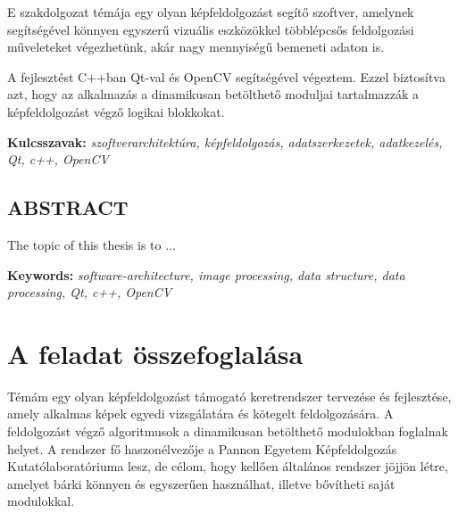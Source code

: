 \documentclass[a4paper,12pt,oneside]{report}
\begin{document}
E szakdolgozat témája egy olyan képfeldolgozást segítő szoftver, amelynek segítségével könnyen egyszerű vizuális eszközökkel többlépcsős feldolgozási műveleteket végezhetünk, akár nagy mennyiségű bemeneti adaton is.

A fejlesztést C++ban Qt-val és OpenCV segítségével végeztem. Ezzel biztosítva azt, hogy az alkalmazás a dinamikusan betölthető moduljai tartalmazzák a képfeldolgozást végző logikai blokkokat.



\vspace{2cm}

{\bf Kulcsszavak:} {\it szoftverarchitektúra, képfeldolgozás, adatszerkezetek, adatkezelés, Qt, c++, OpenCV}
\newpage

\newpage

\begin{center}
\section*{\textbf{\Large \MakeUppercase{Abstract}}}
\end{center}

The topic of this thesis is to ...

\vspace{2cm}

{\bf Keywords:} {\it software-architecture, image processing, data structure, data processing, Qt, c++, OpenCV}
\newpage

\renewcommand{\thefigure}{\arabic{figure}}


\setcounter{tocdepth}{3} %
\thispagestyle{empty}
\tableofcontents
\pagebreak

\setcounter{page}{1} %
\pagestyle{plain}
\fancyhead[C]{\rightmark}
\fancyfoot[R]{\thepage}

\section{A feladat összefoglalása}

Témám egy olyan képfeldolgozást támogató keretrendszer tervezése és fejlesztése, amely alkalmas képek egyedi vizsgálatára és kötegelt feldolgozására. A feldolgozást végző algoritmusok a dinamikusan betölthető modulokban foglalnak helyet. A rendszer fő haszonélvezője a Pannon Egyetem Képfeldolgozás Kutatólaboratóriuma lesz, de célom, hogy kellően általános rendszer jöjjön létre, amelyet bárki könnyen és egyszerűen használhat, illetve bővítheti saját modulokkal.
\end{document}
